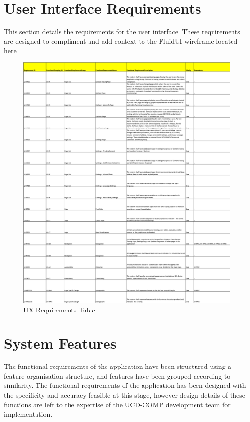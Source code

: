 \documentclass{scrreprt}
\begin{document}
\section{User Interface Requirements}\label{UXReq}
This section details the requirements for the user interface. These requirements are designed to compliment and add context to the FluidUI wireframe located \href{https://www.fluidui.com/editor/live/project/p_5m9EtaKvry2LGyTzKWLHsE64PqSvu3rX}{here}\\
\begin{figure}[H]
	\centering
	\includegraphics[page=1, width=0.95\linewidth]{COMP30830-UserRequirements}
	\caption{UX Requirements Table}
	\label{UXR}
\end{figure}


\section{System Features}
The functional requirements of the application have been structured using a feature organisation structure, and features have been grouped according to similarity. The functional requirements of the application has been designed with the specificity and accuracy feasible at this stage, however design details of these functions are left to the expertise of the UCD-COMP development team for implementation.\\
\\
\end{document}
